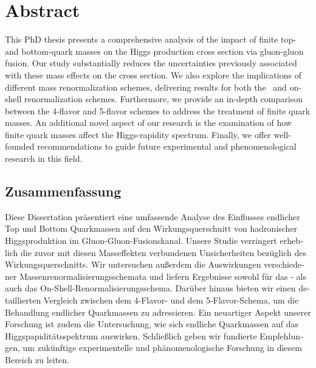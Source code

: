 \begingroup
\let\clearpage\relax
\let\cleardoublepage\relax
\let\cleardoublepage\relax
\chapter*{Abstract}

This PhD thesis presents a comprehensive analysis of the impact of finite top- and bottom-quark masses on the Higgs production cross section via gluon-gluon fusion. Our study substantially reduces the uncertainties previously associated with these mass effects on the cross section. We also explore the implications of different mass renormalization schemes, delivering results for both the \MS\ and on-shell renormalization schemes. Furthermore, we provide an in-depth comparison between the 4-flavor and 5-flavor schemes to address the treatment of finite quark masses. An additional novel aspect of our research is the examination of how finite quark masses affect the Higgs-rapidity spectrum. Finally, we offer well-founded recommendations to guide future experimental and phenomenological research in this field.

\newpage
\begin{otherlanguage}{ngerman}
\chapter*{Zusammenfassung}
Diese Dissertation präsentiert eine umfassende Analyse des Einflusses endlicher Top und Bottom Quarkmassen auf den Wirkungsquerschnitt von hadronischer Higgsproduktion im Gluon-Gluon-Fusionskanal. Unsere Studie verringert erheblich die zuvor mit diesen Masseffekten verbundenen Unsicherheiten bezüglich des Wirkungsquerschnitts. Wir untersuchen außerdem die Auswirkungen verschiedener Massenrenormalisierungsschemata und liefern Ergebnisse sowohl für das \MS- als auch das On-Shell-Renormalisierungsschema. Darüber hinaus bieten wir einen detaillierten Vergleich zwischen dem 4-Flavor- und dem 5-Flavor-Schema, um die Behandlung endlicher Quarkmassen zu adressieren. Ein neuartiger Aspekt unserer Forschung ist zudem die Untersuchung, wie sich endliche Quarkmassen auf das Higgspapiditätsspektrum auswirken. Schließlich geben wir fundierte Empfehlungen, um zukünftige experimentelle und phänomenologische Forschung in diesem Bereich zu leiten.

\end{otherlanguage}

\endgroup

\vfill
